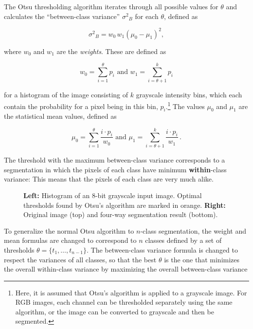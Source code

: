 \noindent The Otsu thresholding algorithm \cite{Otsu} iterates through all possible values for $\theta$ and calculates the ``between-class variance'' ${\sigma^{2}}_B$ for each $\theta$, defined as

\[ {\sigma^2}_{B} = w_0 \, w_1 (\mu_0 - \mu_1)^2,\]

\noindent where $w_0$ and $w_1$ are the \textit{weights}. These are defined as

\[ w_0 = \sum \limits_{i=1}^{\theta} p_i \text{ and } w_1 = \sum \limits_{i=\theta+1}^{k} p_i \]

\noindent for a histogram of the image consisting of $k$ grayscale intensity bins, which each contain the probability for a pixel being in this bin, $p_i$.\footnote{Here, it is assumed that Otsu's algorithm is applied to a grayscale image. For RGB images, each channel can be thresholded separately using the same algorithm, or the image can be converted to grayscale and then be segmented.} The values $\mu_0$ and $\mu_1$ are the statistical mean values, defined as

\[ \mu_0 = \sum \limits_{i=1}^{\theta} \frac{i \cdot p_i}{w_0} \text{ and } \mu_1 = \sum \limits_{i=\theta + 1}^{k} \frac{i \cdot p_i}{w_1} \,. \]

\noindent The threshold with the maximum between-class variance corresponds to a segmentation in which the pixels of each class have minimum \textbf{within}-class variance: This means that the pixels of each class are very much alike.

\begin {figure}[!htb]
	\begin {subfigure}[t]{0.3\linewidth}
	\end {subfigure}
	\hspace{5.5cm}
	\begin {subfigure}[b]{0.3\linewidth}
	\end {subfigure}
		\caption[]{\textbf{Left:} Histogram of an 8-bit grayscale input image. Optimal thresholds found by Otsu's algorithm are marked in orange. \textbf{Right:} Original image (top) and four-way segmentation result (bottom).}
		\label{fig:otsu}
	\end {figure}

\noindent To generalize the normal Otsu algorithm to $n$-class segmentation, the weight and mean formulas are changed to correspond to $n$ classes defined by a set of thresholds $\theta = \{t_1, \dots, t_{n-1}\}$. The between-class variance formula is changed to respect the variances of all classes, so that the best $\theta$ is the one that minimizes the overall within-class variance by maximizing the overall between-class variance

